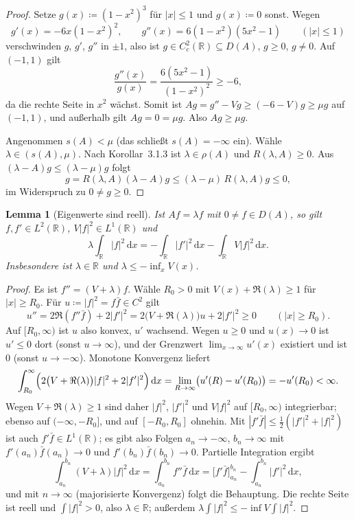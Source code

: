 \documentclass[11pt,a4paper]{article}
\theoremstyle{plain}
\newtheorem{lemma}{Lemma}
\theoremstyle{remark}
\newcommand{\R}{\mathbb{R}}
\newcommand{\dx}{\,\mathrm{d}x}
\begin{document}
\begin{proof}
Setze $g(x) \coloneq (1-x^2)^3$ für $|x| \leq 1$ und $g(x) \coloneq 0$ sonst. Wegen
\[
  g'(x) = -6x(1-x^2)^2, \qquad g''(x) = 6(1-x^2)(5x^2-1) \qquad (|x| \leq 1)
\]
verschwinden $g$, $g'$, $g''$ in $\pm 1$, also ist $g \in C^2_c(\R) \subseteq D(A)$, $g \geq 0$, $g \neq 0$. Auf $(-1,1)$ gilt
\[
  \frac{g''(x)}{g(x)} = \frac{6(5x^2-1)}{(1-x^2)^2} \geq -6 ,
\]
da die rechte Seite in $x^2$ wächst. Somit ist $Ag = g'' - Vg \geq (-6 - V)g \geq \mu g$ auf $(-1,1)$, und außerhalb gilt $Ag = 0 = \mu g$. Also $Ag \geq \mu g$.

Angenommen $s(A) < \mu$ (das schließt $s(A) = -\infty$ ein). Wähle $\lambda \in (s(A),\mu)$. Nach Korollar~3.1.3 ist $\lambda \in \rho(A)$ und $R(\lambda,A) \geq 0$. Aus $(\lambda - A)g \leq (\lambda - \mu)g$ folgt
\[
  g = R(\lambda,A)(\lambda - A)g \leq (\lambda - \mu)\,R(\lambda,A)g \leq 0 ,
\]
im Widerspruch zu $0 \neq g \geq 0$.
\end{proof}

\begin{lemma}[Eigenwerte sind reell]\label{lem:b}
Ist $Af = \lambda f$ mit $0 \neq f \in D(A)$, so gilt $f, f' \in L^2(\R)$, $V|f|^2 \in L^1(\R)$ und
\[
  \lambda \int_{\R} |f|^2 \dx = -\int_{\R} |f'|^2 \dx - \int_{\R} V|f|^2 \dx .
\]
Insbesondere ist $\lambda \in \R$ und $\lambda \leq -\inf_x V(x)$.
\end{lemma}

\begin{proof}
Es ist $f'' = (V+\lambda)f$. Wähle $R_0 > 0$ mit $V(x) + \Re(\lambda) \geq 1$ für $|x| \geq R_0$. Für $u \coloneq |f|^2 = f\bar f \in C^2$ gilt
\[
  u'' = 2\Re(f''\bar f) + 2|f'|^2 = 2\bigl(V + \Re(\lambda)\bigr)u + 2|f'|^2 \geq 0 \qquad (|x| \geq R_0).
\]
Auf $[R_0,\infty)$ ist $u$ also konvex, $u'$ wachsend. Wegen $u \geq 0$ und $u(x) \to 0$ ist $u' \leq 0$ dort (sonst $u \to \infty$), und der Grenzwert $\lim_{x\to\infty} u'(x)$ existiert und ist $0$ (sonst $u \to -\infty$). Monotone Konvergenz liefert
\[
  \int_{R_0}^{\infty} \Bigl(2\bigl(V + \Re(\lambda)\bigr)|f|^2 + 2|f'|^2\Bigr) \dx = \lim_{R\to\infty} \bigl(u'(R) - u'(R_0)\bigr) = -u'(R_0) < \infty .
\]
Wegen $V + \Re(\lambda) \geq 1$ sind daher $|f|^2$, $|f'|^2$ und $V|f|^2$ auf $[R_0,\infty)$ integrierbar; ebenso auf $(-\infty,-R_0]$, und auf $[-R_0,R_0]$ ohnehin. Mit $|f'\bar f| \leq \frac12(|f'|^2 + |f|^2)$ ist auch $f'\bar f \in L^1(\R)$; es gibt also Folgen $a_n \to -\infty$, $b_n \to \infty$ mit $f'(a_n)\bar f(a_n) \to 0$ und $f'(b_n)\bar f(b_n) \to 0$. Partielle Integration ergibt
\[
  \int_{a_n}^{b_n} (V+\lambda)|f|^2 \dx = \int_{a_n}^{b_n} f''\bar f \dx = \bigl[f'\bar f\bigr]_{a_n}^{b_n} - \int_{a_n}^{b_n} |f'|^2 \dx ,
\]
und mit $n \to \infty$ (majorisierte Konvergenz) folgt die Behauptung. Die rechte Seite ist reell und $\int |f|^2 > 0$, also $\lambda \in \R$; außerdem $\lambda\int|f|^2 \leq -\inf V \int |f|^2$.
\end{proof}
\end{document}
